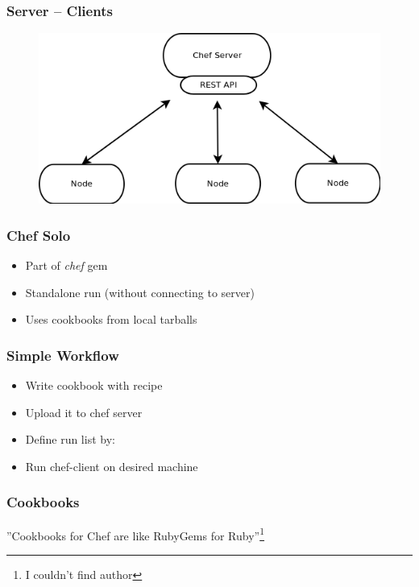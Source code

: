 \documentclass[16pt]{beamer}
\begin{document}
\begin{frame}
  \frametitle{Server -- Clients}
  \begin{figure}
    \includegraphics[width=0.8\linewidth]{images/server-clients}
  \end{figure}
\end{frame}

\begin{frame}
  \frametitle{Chef Solo}
  \begin{itemize}
    \item Part of \emph{chef} gem
    \item Standalone run (without connecting to server)
    \item Uses cookbooks from local tarballs
  \end{itemize}
\end{frame}

\begin{frame}
  \frametitle{Simple Workflow}
  \begin{itemize}
    \item Write cookbook with recipe
    \item Upload it to chef server
    \item Define run list by:
    \item Run chef-client on desired machine
  \end{itemize}
\end{frame}

\begin{frame}
  \frametitle{Cookbooks}
  \begin{center}
    \LARGE ''Cookbooks for Chef are like RubyGems for Ruby''\footnote{I couldn't find author}
  \end{center}
\end{frame}
\end{document}
